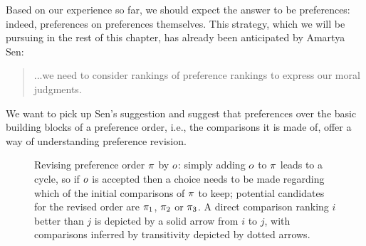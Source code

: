 Based on our experience so far, 
we should expect the answer to be preferences:
indeed, preferences on preferences themselves.
This strategy, which we will be pursuing in the 
rest of this chapter,
has already been anticipated by Amartya Sen:

\begin{quote}
	...we need to consider rankings of preference rankings to express our moral judgments.
	\cite{Sen77}
\end{quote}

We want to pick up Sen's suggestion and 
suggest that preferences over the basic building
blocks of a preference order, 
i.e., the comparisons it is made of, 
offer a way of understanding preference revision.

\begin{figure}\centering
	\caption{
		Revising preference order $\pi$ by $o$: 
		simply adding $o$ to $\pi$ leads to a cycle,
		so if $o$ is accepted then a choice needs 
		to be made regarding which of the initial comparisons of $\pi$ to keep;
		potential candidates for the revised order are $\pi_1$, $\pi_2$ or $\pi_3$.
		A direct comparison ranking $i$ better than $j$ is	depicted by a solid arrow from $i$ to $j$, 
		with comparisons inferred by transitivity depicted by dotted arrows.
		}
	\label{fig:7-pref-change-3-alternatives-ctd}
\end{figure}

